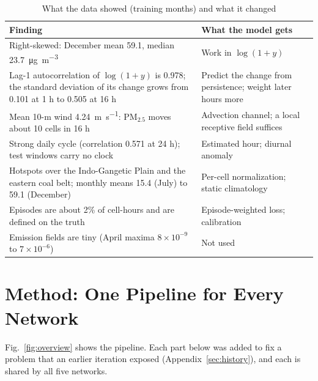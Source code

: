 \documentclass[journal]{IEEEtran}
\newcommand{\ugm}{\si{\micro\gram\per\cubic\metre}}
\newcommand{\PM}{PM$_{2.5}$}
\begin{document}
\begin{table}[!htb]
\centering
\caption{What the data showed (training months) and what it changed}
\label{tab:eda}
\begin{tabular}{@{}>{\raggedright\arraybackslash}p{}>{\raggedright\arraybackslash}p{}@{}}
\toprule
Finding & What the model gets \\
\midrule
Right-skewed: December mean 59.1, median 23.7~\ugm & Work in $\log(1+y)$ \\
Lag-1 autocorrelation of $\log(1+y)$ is 0.978; the standard deviation of its change grows from 0.101 at 1 h to 0.505 at 16 h & Predict the change from persistence; weight later hours more \\
Mean 10-m wind 4.24~\si{\metre\per\second}: \PM{} moves about 10 cells in 16 h & Advection channel; a local receptive field suffices \\
Strong daily cycle (correlation 0.571 at 24 h); test windows carry no clock & Estimated hour; diurnal anomaly \\
Hotspots over the Indo-Gangetic Plain and the eastern coal belt; monthly means 15.4 (July) to 59.1 (December) & Per-cell normalization; static climatology \\
Episodes are about 2\% of cell-hours and are defined on the truth & Episode-weighted loss; calibration \\
Emission fields are tiny (April maxima $8\times10^{-9}$ to $7\times10^{-6}$) & Not used \\
\bottomrule
\end{tabular}
\end{table}

\section{Method: One Pipeline for Every Network}
\label{sec:method}
Fig.~\ref{fig:overview} shows the pipeline. Each part below was added to fix a problem that an earlier iteration exposed (Appendix~\ref{sec:history}), and each is shared by all five networks.
\end{document}
